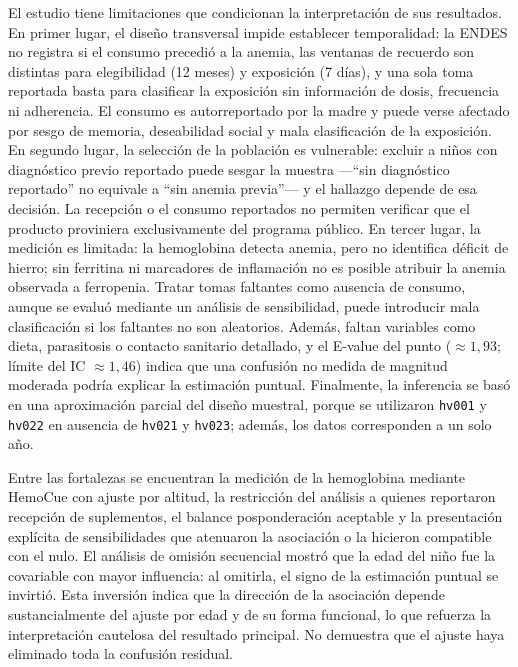 \documentclass[man,11pt,donotrepeattitle,floatsintext]{apa7}
\begin{document}
El estudio tiene limitaciones que condicionan la interpretación de sus resultados. En primer lugar, el diseño transversal impide establecer temporalidad: la ENDES no registra si el consumo precedió a la anemia, las ventanas de recuerdo son distintas para elegibilidad (12 meses) y exposición (7 días), y una sola toma reportada basta para clasificar la exposición sin información de dosis, frecuencia ni adherencia. El consumo es autorreportado por la madre y puede verse afectado por sesgo de memoria, deseabilidad social y mala clasificación de la exposición. En segundo lugar, la selección de la población es vulnerable: excluir a niños con diagnóstico previo reportado puede sesgar la muestra ---``sin diagnóstico reportado'' no equivale a ``sin anemia previa''--- y el hallazgo depende de esa decisión. La recepción o el consumo reportados no permiten verificar que el producto proviniera exclusivamente del programa público. En tercer lugar, la medición es limitada: la hemoglobina detecta anemia, pero no identifica déficit de hierro; sin ferritina ni marcadores de inflamación no es posible atribuir la anemia observada a ferropenia. Tratar tomas faltantes como ausencia de consumo, aunque se evaluó mediante un análisis de sensibilidad, puede introducir mala clasificación si los faltantes no son aleatorios. Además, faltan variables como dieta, parasitosis o contacto sanitario detallado, y el E-value del punto ($\approx 1{,}93$; límite del IC $\approx 1{,}46$) indica que una confusión no medida de magnitud moderada podría explicar la estimación puntual. Finalmente, la inferencia se basó en una aproximación parcial del diseño muestral, porque se utilizaron \texttt{hv001} y \texttt{hv022} en ausencia de \texttt{hv021} y \texttt{hv023}; además, los datos corresponden a un solo año.



Entre las fortalezas se encuentran la medición de la hemoglobina mediante HemoCue con ajuste por altitud, la restricción del análisis a quienes reportaron recepción de suplementos, el balance posponderación aceptable y la presentación explícita de sensibilidades que atenuaron la asociación o la hicieron compatible con el nulo. El análisis de omisión secuencial mostró que la edad del niño fue la covariable con mayor influencia: al omitirla, el signo de la estimación puntual se invirtió. Esta inversión indica que la dirección de la asociación depende sustancialmente del ajuste por edad y de su forma funcional, lo que refuerza la interpretación cautelosa del resultado principal. No demuestra que el ajuste haya eliminado toda la confusión residual.
\end{document}
